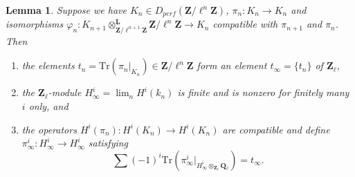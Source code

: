 \documentclass{stacks-project}
\theoremstyle{plain}
\newtheorem{lemma}[subsection]{Lemma}
\theoremstyle{definition}
\theoremstyle{remark}
\numberwithin{equation}{subsection}
\def\lim{\mathop{\mathrm{lim}}\nolimits}
\begin{document}
\begin{lemma}
\label{lemma-piece-together}
Suppose we have
$K_n\in D_{perf}(\mathbf{Z}/\ell^n\mathbf{Z})$, $\pi_n : K_n\to K_n$
and isomorphisms
$\varphi_n :
K_{n+1} \otimes^\mathbf{L}_{\mathbf{Z}/\ell^{n+1}\mathbf{Z}}
\mathbf{Z}/\ell^n\mathbf{Z}
\to K_n$
compatible with $\pi_{n+1}$ and $\pi_n$. Then
\begin{enumerate}
\item
the elements $t_n = \text{Tr}(\pi_n |_{K_n})\in \mathbf{Z}/\ell^n\mathbf{Z}$
form an element $t_\infty = \{t_n\}$ of $\mathbf{Z}_\ell$,
\item
the $\mathbf{Z}_\ell$-module $H_\infty^i = \lim_n H^i(k_n)$ is finite and
is nonzero for finitely many $i$ only, and
\item
the operators $H^i(\pi_n): H^i(K_n)\to H^i(K_n)$ are compatible and define
$\pi_\infty^i : H_\infty^i\to H_\infty^i$ satisfying
$$
\sum (-1)^i \text{Tr}(
\pi_\infty^i |_{H_\infty^i \otimes_{\mathbf{Z}_\ell}\mathbf{Q}_\ell}) =
t_\infty.
$$
\end{enumerate}
\end{lemma}
\end{document}
